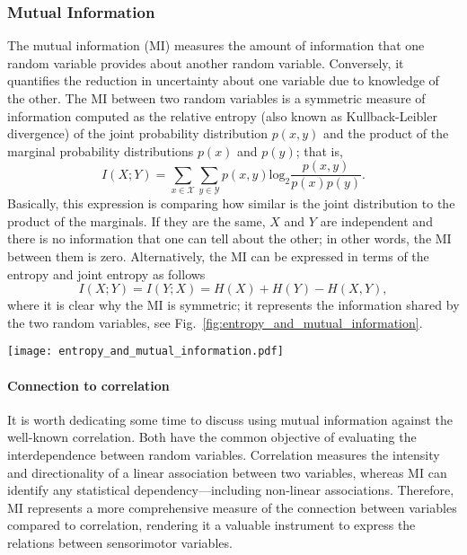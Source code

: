 \subsubsection{Mutual Information}
The mutual information (MI) measures the amount of information that one random variable provides about another random variable. Conversely, it quantifies the reduction in uncertainty about one variable due to knowledge of the other. The MI between two random variables is a symmetric measure of information computed as the relative entropy (also known as Kullback-Leibler divergence) of the joint probability distribution $p\left(x,y\right)$ and the product of the marginal probability distributions $p\left(x\right)$ and $p\left(y\right)$; that is,
\begin{equation}\label{eq:mutual_information}
	I\left(X;Y\right) = \sum_{x \in \mathcal{X}}\sum_{y \in \mathcal{Y}}p\left(x,y\right) \text{log}_2\frac{p\left(x,y\right)}{p\left(x\right)p\left(y\right)}.
\end{equation}
Basically, this expression is comparing how similar is the joint distribution to the product of the marginals. If they are the same, $X$ and $Y$ are independent and there is no information that one can tell about the other; in other words, the MI between them is zero. Alternatively, the MI can be expressed in terms of the entropy and joint entropy as follows
\begin{equation}\label{eq:mutual_information}
	I\left(X;Y\right) =I\left(Y;X\right) = H(X) + H(Y) - H(X,Y),
\end{equation}
where it is clear why the MI is symmetric; it represents the information shared by the two random variables, see Fig.~\ref{fig:entropy_and_mutual_information}.
\begin{figure*}[!t]
	\centering	
	\hspace*{\fill}
	\texttt{[image: entropy\_and\_mutual\_information.pdf]}
	\hspace*{\fill}	
	\caption[] {\label{fig:entropy_and_mutual_information}\textbf{Relation between entropy and mutual information.} The mutual information between two variables expresses the amount of information that one variable contains about the to other.}
\end{figure*}
\paragraph*{Connection to correlation} It is worth dedicating some time to discuss using mutual information against the well-known correlation. Both have the common objective of evaluating the interdependence between random variables. Correlation measures the intensity and directionality of a linear association between two variables, whereas MI can identify any statistical dependency---including non-linear associations. Therefore, MI represents a more comprehensive measure of the connection between variables compared to correlation, rendering it a valuable instrument to express the relations between sensorimotor variables.


